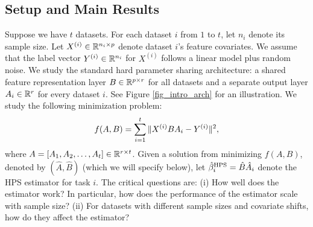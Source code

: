 \subsection{Setup and Main Results}

Suppose we have $t$ datasets.
For each dataset $i$ from $1$ to $t$, let $n_i$ denote its sample size.
Let $X^{(i)} \in \mathbb{R}^{n_i \times p}$ denote dataset $i$'s feature covariates.
We assume that the label vector $Y^{(i)} \in \mathbb{R}^{n_i}$ for $X^{(i)}$ follows a linear model plus random noise.
We study the standard hard parameter sharing architecture:
a shared feature representation layer $B\in\mathbb{R}^{p\times r}$ for all datasets and a separate output layer $A_i \in \mathbb{R}^r$ for every dataset $i$.
See Figure \ref{fig_intro_arch} for an illustration.
We study the following minimization problem:
\begin{align}\label{eq_mtl}
			f(A, B) = \sum_{i=1}^t \|X^{(i)} B A_i - Y^{(i)}\|^2,
\end{align}
where $A = [A_1, A_2, \dots, A_t] \in \mathbb{R}^{r \times t}$.
Given a solution from minimizing $f(A, B)$, denoted by $(\hat{A}, \hat{B})$  (which we will specify below), let $\hat{\beta}_i^{\textup{HPS}} = \hat{B} \hat{A}_i$ denote the HPS estimator for task $i$.
The critical questions are:
(i) How well does the estimator work? In particular, how does the performance of the estimator scale with sample size?
(ii) For datasets with different sample sizes and covariate shifts, how do they affect the estimator?

